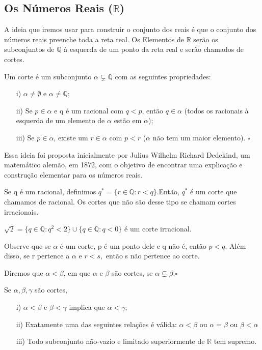 \documentclass[Analysis/analysis_notes.tex]{subfiles}
\begin{document}
\subsection{Os N\'umeros Reais ($\mathbb{R}$)}
A ideia que iremos usar para construir o conjunto dos reais \'e que o conjunto dos n\'umeros reais preenche toda a reta real. Os Elementos
de $\mathbb{R}$ ser\~ao os subconjuntos de $\mathbb{Q}$ \`a esquerda de um ponto da reta real e ser\~ao chamados de cortes.
\begin{def*}
	Um corte \'e um subconjunto $\alpha\subsetneq \mathbb{Q}$ com as seguintes propriedades:
	\begin{itemize}
		\item[i)] $\alpha\neq \emptyset$ e $\alpha \neq \mathbb{Q};$
		\item[ii)] Se $p\in \alpha$ e q \'e um racional com $q < p$, ent\~ao $q\in \alpha$ (todos os racionais \`a esquerda de um elemento
		      de $\alpha$ est\~ao em $\alpha$);
		\item[iii)] Se $p\in \alpha$, existe um $r\in \alpha$ com $p < r$ ($\alpha$ n\~ao tem um maior elemento). $\square$
	\end{itemize}
\end{def*}
Essa ideia foi proposta inicialmente por Julius Wilhelm Richard Dedekind, um matem\'atico alem\~ao, em 1872, com o objetivo de encontrar uma explica\c c\~ao
e constru\c c\~ao elementar para os n\'umeros reais.
\begin{example}
	Se q \'e um racional, definimos $q^{*} = \{r\in \mathbb{Q}: r < q\}$.Ent\~ao, $q^{*}$ \'e um corte que chamamos de racional. Os
	cortes que n\~ao s\~ao desse tipo se chamam cortes irracionais.
\end{example}
\begin{example}
	$\sqrt{2} = \{q\in \mathbb{Q}: q^{2} < 2\}\cup \{q\in \mathbb{Q}: q < 0\}$ \'e um corte irracional.
\end{example}
Observe que se $\alpha$ \'e um corte, p \'e um ponto dele e q n\~ao \'e, ent\~ao $p < q$. Al\'em disso, se r pertence a $\alpha$
e $r < s,$ ent\~ao s n\~ao pertence ao corte.
\begin{def*}
	Diremos que $\alpha < \beta$, em que $\alpha$ e $\beta$ s\~ao cortes, se $\alpha\subsetneq \beta.\square$
\end{def*}
\begin{prop*}
	Se $\alpha, \beta, \gamma$ s\~ao cortes,
	\begin{itemize}
		\item[i)] $\alpha < \beta$ e $\beta < \gamma$ implica que $\alpha < \gamma$;
		\item[ii)] Exatamente uma das seguintes rela\c c\~oes \'e v\'alida: $\alpha < \beta$ ou $\alpha = \beta$ ou $\beta < \alpha$
		\item[iii)] Todo subconjunto n\~ao-vazio e limitado superiormente de $\mathbb{R}$ tem supremo.
	\end{itemize}
\end{prop*}
\end{document}
